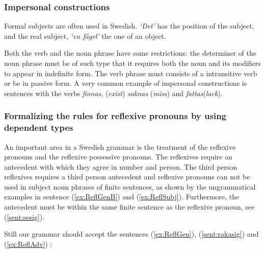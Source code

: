 \documentclass[runningheads,a4paper]{llncs}
\begin{document}
\subsubsection{Impersonal constructions}
\label{sec:Formal}
Formal subjects \cite[]{SAG} are often used in Swedish.
\emph{`Det'} has the position of the subject, and the real subject, 
\emph{`en fågel'} the one of an object.

Both the verb and the noun phrase have some restrictions: the determiner of the
noun phrase must be of such type that it requires both the noun and its modifiers
to appear in indefinite form. The verb phrase must consists of a intransitive verb
or be in passive form.
A very common example of impersonal constructions is sentences with the verbs \emph{finnas},
(\emph{exist})
\emph{saknas} (\emph{miss}) and \emph{fattas}(\emph{lack}).

\subsubsection{Formalizing the rules for reflexive pronouns by using dependent types}
\label{sec:reflexives}
An important area in a Swedish grammar is the treatment of the reflexive pronouns and
the reflexive possessive pronouns.
The reflexives require an antecedent with which they agree in
number and person.
The third person reflexives requires a third person antecedent and
reflexive pronouns can not be used in subject noun phrases of finite sentences,
as shown by the ungrammatical examples in 
sentence (\ref{ex:ReflGenB}) and (\ref{ex:ReflSubj}).
Furthermore, the antecedent must be within the same finite sentence as the reflexive
pronoun, see (\ref{sent:sesig}).

Still our grammar should accept the sentences (\ref{ex:ReflGen}),
(\ref{sent:rakasig}) and (\ref{ex:ReflAdv}) :
\end{document}
